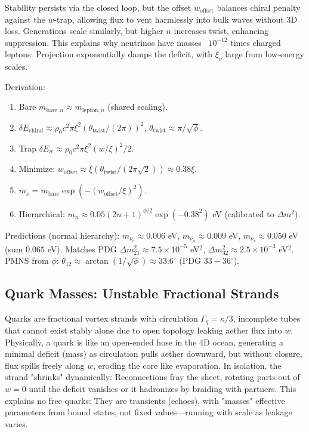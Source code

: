 \documentclass{article}
\begin{document}
Stability persists via the closed loop, but the offset $w_{\text{offset}}$ balances chiral penalty against the $w$-trap, allowing flux to vent harmlessly into bulk waves without 3D loss. Generations scale similarly, but higher $n$ increases twist, enhancing suppression. This explains why neutrinos have masses ~$10^{-12}$ times charged leptons: Projection exponentially damps the deficit, with $\xi_{\nu}$ large from low-energy scales.

Derivation:
\begin{enumerate}
\item Bare $m_{\text{bare},n} \approx m_{\text{lepton},n}$ (shared scaling).
\item $\delta E_{\text{chiral}} \approx \rho_0 c^2 \pi \xi^2 (\theta_{\text{twist}} / (2\pi))^2$, $\theta_{\text{twist}} \approx \pi / \sqrt{\phi}$.
\item Trap $\delta E_w \approx \rho_0 c^2 \pi \xi^2 (w / \xi)^2 / 2$.
\item Minimize: $w_{\text{offset}} \approx \xi (\theta_{\text{twist}} / (2\pi \sqrt{2})) \approx 0.38 \xi$.
\item $m_\nu = m_{\text{bare}} \exp( - (w_{\text{offset}} / \xi)^2 )$.
\item Hierarchical: $m_n \approx 0.05 (2n+1)^{\phi/2} \exp(-0.38^2)$ eV (calibrated to $\Delta m^2$).
\end{enumerate}

Predictions (normal hierarchy): $m_{\nu_e} \approx 0.006$ eV, $m_{\nu_\mu} \approx 0.009$ eV, $m_{\nu_\tau} \approx 0.050$ eV (sum $0.065$ eV). Matches PDG $\Delta m^2_{21} \approx 7.5 \times 10^{-5}$ eV$^2$, $\Delta m^2_{32} \approx 2.5 \times 10^{-3}$ eV$^2$. PMNS from $\phi$: $\theta_{12} \approx \arctan(1/\sqrt{\phi}) \approx 33.6^\circ$ (PDG $33-36^\circ$).

\subsection{Quark Masses: Unstable Fractional Strands}

Quarks are fractional vortex strands with circulation $\Gamma_q = \kappa / 3$, incomplete tubes that cannot exist stably alone due to open topology leaking aether flux into $w$. Physically, a quark is like an open-ended hose in the 4D ocean, generating a minimal deficit (mass) as circulation pulls aether downward, but without closure, flux spills freely along $w$, eroding the core like evaporation. In isolation, the strand "shrinks" dynamically: Reconnections fray the sheet, rotating parts out of $w=0$ until the deficit vanishes or it hadronizes by braiding with partners. This explains no free quarks: They are transients (echoes), with "masses" effective parameters from bound states, not fixed values—running with scale as leakage varies.
\end{document}
